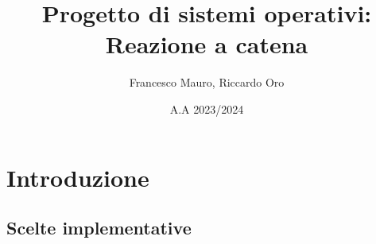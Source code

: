 \documentclass{article}
\title{Progetto di sistemi operativi: Reazione a catena}
\author{Francesco Mauro, Riccardo Oro}
\date{A.A 2023/2024}
\begin{document}
\maketitle
\tableofcontents

\chapter{Introduzione}
\section{Scelte implementative}
\end{document}
